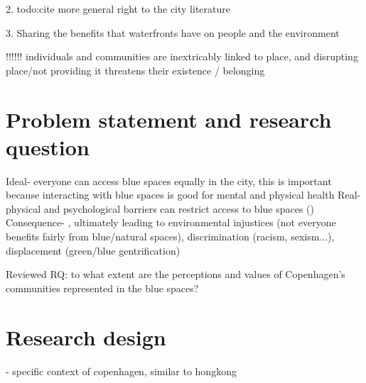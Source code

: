 \documentclass{article}
\begin{document}
	2. todo:cite more general right to the city literature

	3. Sharing the benefits that waterfronts have on people and the environment
	
!!!!!! individuals and communities are inextricably linked to place, and disrupting place/not providing it threatens their existence / belonging



\section{Problem statement and research question}

Ideal- everyone can access blue spaces equally in the city, this is important because interacting with blue spaces is good for mental and physical health 
Real- physical and psychological barriers can restrict access to blue spaces ()
Consequence- , ultimately leading to environmental injustices (not everyone benefits fairly from blue/natural spaces), discrimination (racism, sexism...), displacement (green/blue gentrification)

Reviewed RQ: to what extent are the perceptions and values of Copenhagen's communities represented in the blue spaces?



\section{Research design}

- specific context of copenhagen, similar to hongkong 

\printbibliography
\end{document}
